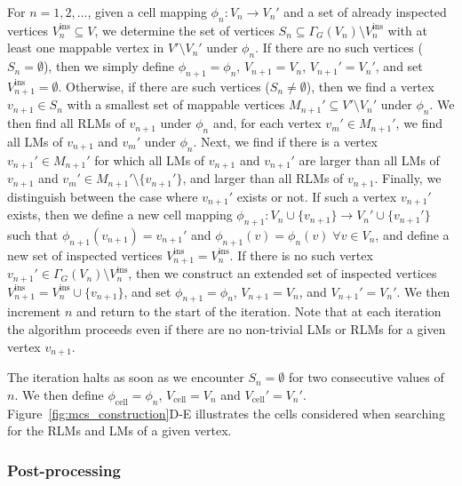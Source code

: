 \documentclass[a4paper,11pt]{article}
\begin{document}
For $n = 1, 2, \ldots$, given a cell mapping $\phi_{n} : V_{n} \rightarrow V_{n}'$ and a set of already inspected vertices $V^\mathrm{ins}_{n} \subseteq V$, we determine the set of vertices $S_{n} \subseteq \Gamma_{G}(V_{n}) \setminus V^\mathrm{ins}_{n}$ with at least one mappable vertex in $V'\setminus V_{n}'$ under $\phi_{n}$. 
If there are no such vertices ($S_{n} = \emptyset$), then we simply define $\phi_{n+1} = \phi_n$, $V_{n+1} = V_n$, $V_{n+1}' = V_n'$, and set $V^\mathrm{ins}_{n+1} = \emptyset$. 
Otherwise, if there are such vertices ($S_{n} \neq \emptyset$), then we find a vertex $v_{n+1} \in S_{n}$ with a smallest set of mappable vertices $M_{n+1}' \subseteq V'\setminus V_{n}'$ under $\phi_{n}$. We then find all RLMs of $v_{n+1}$ under $\phi_n$ and, for each vertex $v_{m}' \in M_{n+1}'$, we find all LMs of $v_{n+1}$ and $v_{m}'$ under $\phi_n$. 
Next, we find if there is a vertex $v_{n+1}' \in M_{n+1}'$ for which all LMs of $v_{n+1}$ and $v_{n+1}'$ are larger than all LMs of $v_{n+1}$ and $v_{m}' \in M_{n+1}'\setminus \{ v_{n+1}' \}$, and larger than all RLMs of $v_{n+1}$. 
Finally, we distinguish between the case where $v_{n+1}'$ exists or not. 
If such a vertex $v_{n+1}'$ exists, then we define a new cell mapping $\phi_{n+1} : V_{n} \cup \{v_{n+1}\} \rightarrow V_{n}' \cup \{v_{n+1}'\}$ such that $\phi_{n+1}(v_{n+1}) = v_{n+1}'$ and $\phi_{n+1}(v) = \phi_n(v) \; \forall v \in V_n$, and define a new set of inspected vertices $V^\mathrm{ins}_{n+1} = V^\mathrm{ins}_{n}$. 
If there is no such vertex $v_{n+1}' \in \Gamma_{G}(V_{n}) \setminus V^\mathrm{ins}_{n}$, then we construct an extended set of inspected vertices $V^\mathrm{ins}_{n+1} = V^\mathrm{ins}_n \cup \{v_{n+1}\}$, and set $\phi_{n+1} = \phi_n$, $V_{n+1} = V_n$, and $V_{n+1}' = V_n'$. 
We then increment $n$ and return to the start of the iteration.
Note that at each iteration the algorithm proceeds even if there are no non-trivial LMs or RLMs for a given vertex $v_{n+1}$.

The iteration halts as soon as we encounter $S_{n} = \emptyset$ for two consecutive values of $n$. 
We then define $\phi_{\mathrm{cell}} = \phi_{n}$, $V_{\mathrm{cell}} = V_{n}$ and $V_{\mathrm{cell}}' = V_{n}'$. 
Figure~\ref{fig:mcs_construction}D-E illustrates the cells considered when searching for the RLMs and LMs of a given vertex.


\subsubsection*{Post-processing}
\end{document}
